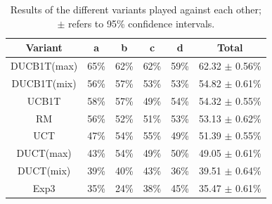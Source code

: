 \documentclass{article}
\begin{document}
\begin{table}[h!]
\scriptsize
\begin{minipage}{.51\textwidth}
\begin{tabular}{|c||c|c|c|c|c|}
									\hline
 Variant	& a 		  & b 		  & c 		  & d 		  & Total 	\\ \hline
 DUCB1T(max) & 65\% & 62\% & 62\% & 59\% & 62.32 $\pm$ 0.56\% \\ \hline
 DUCB1T(mix) & 56\% & 57\% & 53\% & 53\% & 54.82 $\pm$ 0.61\% \\ \hline
 UCB1T & 58\% & 57\% & 49\% & 54\% & 54.32 $\pm$ 0.55\% \\ \hline
        RM & 56\% & 52\% & 51\% & 53\% & 53.13 $\pm$ 0.62\% \\ \hline
   UCT & 47\% & 54\% & 55\% & 49\% & 51.39 $\pm$ 0.55\% \\ \hline
   DUCT(max) & 43\% & 54\% & 49\% & 50\% & 49.05 $\pm$ 0.61\% \\ \hline
   DUCT(mix) & 39\% & 40\% & 43\% & 36\% & 39.51 $\pm$ 0.64\% \\ \hline
      Exp3 & 35\% & 24\% & 38\% & 45\% & 35.47 $\pm$ 0.61\% \\ \hline
\end{tabular}
\caption{Results of the different variants played against each other; $\pm$ refers to 95\% confidence intervals. \label{tbl:overall-avgs}}
\end{minipage}
~~~~~
\begin{minipage}{.4\textwidth}
\scriptsize

\end{minipage}
\end{table}
\end{document}
